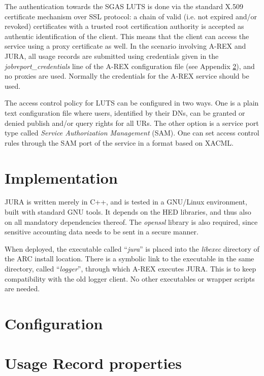 \documentclass{article}                            %
\begin{document}
The authentication towards the SGAS LUTS is done via the standard
X.509 certificate mechanism over SSL protocol: a chain of valid
(i.e. not expired and/or revoked) certificates with a trusted root
certification authority is accepted as authentic identification of the
client. This means that the client can access the service using a
proxy certificate as well. In the scenario involving A-REX and JURA,
all usage records are submitted using credentials given in the
\textit{jobreport\_credentials} line of the A-REX configuration file
(see Appendix \ref{config}), and no proxies are used. Normally the
credentials for the A-REX service should be used.

The access control policy for LUTS can be configured in two ways. One
is a plain text configuration file where users, identified by their
DNs, can be granted or denied publish and/or query rights for all
URs. The other option is a service port type called \textit{Service
  Authorization Management} (SAM). One can set access control rules
through the SAM port of the service in a format based on XACML. 

\section{Implementation}
JURA is written merely in C++, and is tested in a GNU/Linux
environment, built with standard GNU tools. It depends on the HED
libraries, and thus also on all mandatory dependencies thereof. The
\textit{openssl} library is also required, since sensitive accounting
data needs to be sent in a secure manner.


When deployed, the executable called ``\textit{jura}'' is placed into the
\textit{libexec} directory of the ARC install location. There is a
symbolic link %
to the executable in the same directory, called ``\textit{logger}'',
through which A-REX executes JURA. This is to keep compatibility with
the old logger client. No other executables or wrapper scripts are
needed.

\appendix

\section{Configuration}
\label{config}






\section{Usage Record properties}
\label{log2ur}




\end{document}
